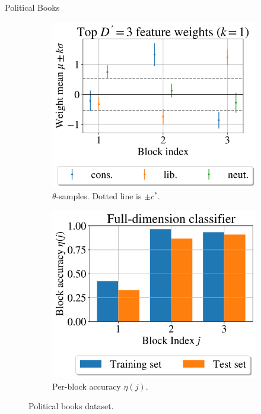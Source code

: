 \documentclass{beamer}
\begin{document}
	\begin{frame}{Political Books}
		\begin{figure}[!h]
			\centering
			\begin{subfigure}[t]{0.452\linewidth}
				\centering
				\vskip 0pt
				\includegraphics[width=\linewidth]{polbooks-null-1}
				\caption{$\theta$-samples. Dotted line is $\pm c^*$.}
				\label{fig:polbooks-null}
			\end{subfigure}
			\begin{subfigure}[t]{0.45\linewidth}
				\centering
				\vskip 0pt
				\includegraphics[width=\linewidth]{polbooks-accuracy-1}
				\caption{Per-block accuracy $\eta(j)$.}
				\label{fig:polbooks-accuracy}
			\end{subfigure}
			\caption{Political books dataset.}
			\label{fig:polbooks}
		\end{figure}
	\end{frame}
\end{document}
